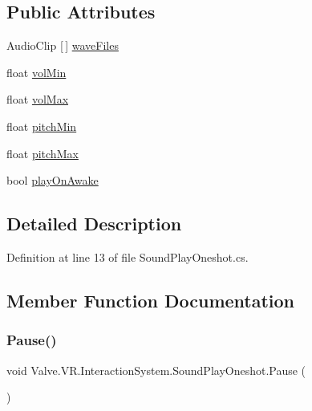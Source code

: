 \subsection*{Public Attributes}
\begin{DoxyCompactItemize}
\item 
Audio\+Clip \mbox{[}$\,$\mbox{]} \mbox{\hyperlink{class_valve_1_1_v_r_1_1_interaction_system_1_1_sound_play_oneshot_a1aacc158d26e2382435f2627e3d863e2}{wave\+Files}}
\item 
float \mbox{\hyperlink{class_valve_1_1_v_r_1_1_interaction_system_1_1_sound_play_oneshot_a046eafb48c98823a1e755fa1689dc661}{vol\+Min}}
\item 
float \mbox{\hyperlink{class_valve_1_1_v_r_1_1_interaction_system_1_1_sound_play_oneshot_a5c47e31ca2f54ea4d0f406b405ddc290}{vol\+Max}}
\item 
float \mbox{\hyperlink{class_valve_1_1_v_r_1_1_interaction_system_1_1_sound_play_oneshot_a4eb0348e9039feb13144d27430b67ff3}{pitch\+Min}}
\item 
float \mbox{\hyperlink{class_valve_1_1_v_r_1_1_interaction_system_1_1_sound_play_oneshot_ab987a84031156be1df57103dd47dbc8a}{pitch\+Max}}
\item 
bool \mbox{\hyperlink{class_valve_1_1_v_r_1_1_interaction_system_1_1_sound_play_oneshot_a31524e6fefed37f5661bf14143d97e0b}{play\+On\+Awake}}
\end{DoxyCompactItemize}


\subsection{Detailed Description}


Definition at line 13 of file Sound\+Play\+Oneshot.\+cs.



\subsection{Member Function Documentation}
\mbox{\label{class_valve_1_1_v_r_1_1_interaction_system_1_1_sound_play_oneshot_adcfbbd0db7e01bf3141d24c17d13aa32}} 
\subsubsection{\texorpdfstring{Pause()}{Pause()}}
{\footnotesize\ttfamily void Valve.\+V\+R.\+Interaction\+System.\+Sound\+Play\+Oneshot.\+Pause (\begin{DoxyParamCaption}{ }\end{DoxyParamCaption})}



